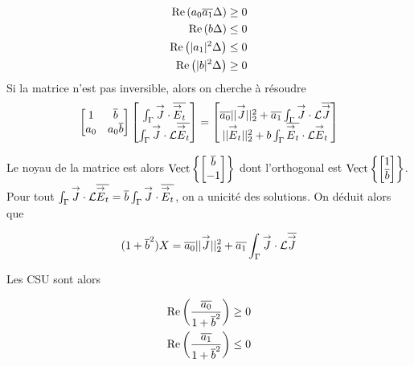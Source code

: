     \begin{align}
    \Re\left(a_0\conj{a_1}\Delta\right) &\ge 0\\
    \Re\left(b\Delta\right) &\le 0\\
    \Re\left(|a_1|^2\Delta\right) &\le 0\\
    \Re\left(|b|^2\Delta\right) &\ge 0
  \end{align}
  Si la matrice n'est pas inversible, alors on cherche à résoudre
  \[
    \begin{bmatrix}
      1 & \conj{b} \\
      a_0 & a_0\conj{b}
    \end{bmatrix}
    \begin{bmatrix}
      \int_\Gamma \vJ \cdot \conj{\vE_t} \\
      \int_\Gamma \vJ \cdot \LL\conj{\vE_t}
    \end{bmatrix}
    =
    \begin{bmatrix}
      \conj{a_0}||\vJ||_2^2 + \conj{a_1}\int_\Gamma \vJ \cdot \LL\conj{\vJ} \\
      ||\vE_t||_2^2 + b\int_\Gamma \conj{\vE_t} \cdot \LL\vE_t
    \end{bmatrix}
  \]

  Le noyau de la matrice est alors \(\Vect{\begin{bmatrix}\conj{b}\\-1\end{bmatrix}}\) dont l'orthogonal est  \(\Vect{\begin{bmatrix}1\\\conj{b}\end{bmatrix}}\).
  Pour tout \(\int_\Gamma \vJ\cdot \LL\conj{\vE_t} = \conj{b} \int_\Gamma \vJ \cdot \conj{\vE_t} \), on a unicité des solutions. On déduit alors que

  \[
    (1 + \conj{b}^2) X = \conj{a_0} ||\vJ||_2^2 + \conj{a_1}\int_\Gamma \vJ \cdot \LL\conj{\vJ}
  \]

  Les CSU sont alors

  \begin{align}
    \Re\left(\frac{\conj{a_0}}{1 + \conj{b}^2}\right) &\ge 0 \\
    \Re\left(\frac{\conj{a_1}}{1 + \conj{b}^2}\right) &\le 0
  \end{align}



